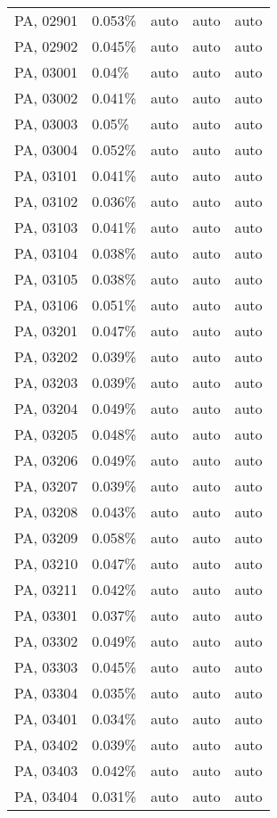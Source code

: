\begin{longtable}[]{@{}lllll@{}}
PA, 02901 & 0.053\% & auto & auto & auto \\
PA, 02902 & 0.045\% & auto & auto & auto \\
PA, 03001 & 0.04\% & auto & auto & auto \\
PA, 03002 & 0.041\% & auto & auto & auto \\
PA, 03003 & 0.05\% & auto & auto & auto \\
PA, 03004 & 0.052\% & auto & auto & auto \\
PA, 03101 & 0.041\% & auto & auto & auto \\
PA, 03102 & 0.036\% & auto & auto & auto \\
PA, 03103 & 0.041\% & auto & auto & auto \\
PA, 03104 & 0.038\% & auto & auto & auto \\
PA, 03105 & 0.038\% & auto & auto & auto \\
PA, 03106 & 0.051\% & auto & auto & auto \\
PA, 03201 & 0.047\% & auto & auto & auto \\
PA, 03202 & 0.039\% & auto & auto & auto \\
PA, 03203 & 0.039\% & auto & auto & auto \\
PA, 03204 & 0.049\% & auto & auto & auto \\
PA, 03205 & 0.048\% & auto & auto & auto \\
PA, 03206 & 0.049\% & auto & auto & auto \\
PA, 03207 & 0.039\% & auto & auto & auto \\
PA, 03208 & 0.043\% & auto & auto & auto \\
PA, 03209 & 0.058\% & auto & auto & auto \\
PA, 03210 & 0.047\% & auto & auto & auto \\
PA, 03211 & 0.042\% & auto & auto & auto \\
PA, 03301 & 0.037\% & auto & auto & auto \\
PA, 03302 & 0.049\% & auto & auto & auto \\
PA, 03303 & 0.045\% & auto & auto & auto \\
PA, 03304 & 0.035\% & auto & auto & auto \\
PA, 03401 & 0.034\% & auto & auto & auto \\
PA, 03402 & 0.039\% & auto & auto & auto \\
PA, 03403 & 0.042\% & auto & auto & auto \\
PA, 03404 & 0.031\% & auto & auto & auto \\

\end{longtable}
